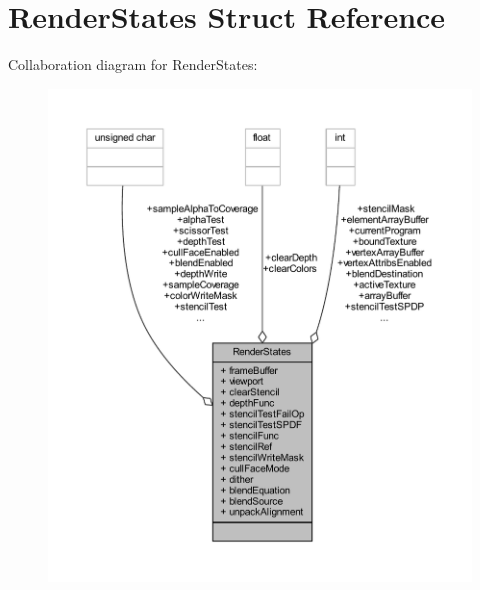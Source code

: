 \hypertarget{struct_render_states}{\section{Render\-States Struct Reference}
\label{struct_render_states}
}


Collaboration diagram for Render\-States\-:\nopagebreak
\begin{figure}[H]
\begin{center}
\leavevmode
\includegraphics[width=350pt]{struct_render_states__coll__graph}
\end{center}
\end{figure}
